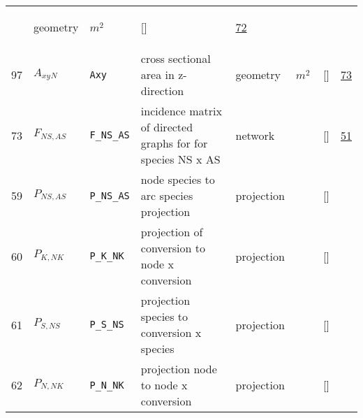 \begin{longtable}{|p{1cm}|p{3cm}|p{3cm}|p{7cm}|p{3.0cm}|p{3cm}|p{2cm}|p{1cm}|}
             & \begin{lay}geometry \end{lay}
             & $ m^{2} \, $
             & []
             & \hyperlink{"e:72"}{ 72 }
                 \\
    97
             & \hypertarget{"v:97"}{ $ {A_{xy}}{_{N}} $}
             & \verb|Axy|
             & cross sectional area in z-direction
             & \begin{lay}geometry \end{lay}
             & $ m^{2} \, $
             & []
             & \hyperlink{"e:73"}{ 73 }
                 \\
    73
             & \hypertarget{"v:73"}{ $ {F}{_{{N S}, {A S}}} $}
             & \verb|F_NS_AS|
             & incidence matrix of directed graphs for for species NS x AS
             & \begin{lay}network \end{lay}
             & $  $
             & []
             & \hyperlink{"e:51"}{ 51 }
                 \\
    59
             & \hypertarget{"v:59"}{ $ {P}{_{{N S}, {A S}}} $}
             & \verb|P_NS_AS|
             & node species to arc species projection
             & \begin{lay}projection \end{lay}
             & $  $
             & []
             & \\
    60
             & \hypertarget{"v:60"}{ $ {P}{_{K, {N K}}} $}
             & \verb|P_K_NK|
             & projection of conversion to node x conversion
             & \begin{lay}projection \end{lay}
             & $  $
             & []
             & \\
    61
             & \hypertarget{"v:61"}{ $ {P}{_{S, {N S}}} $}
             & \verb|P_S_NS|
             & projection species to conversion x species
             & \begin{lay}projection \end{lay}
             & $  $
             & []
             & \\
    62
             & \hypertarget{"v:62"}{ $ {P}{_{N, {N K}}} $}
             & \verb|P_N_NK|
             & projection node to node x conversion
             & \begin{lay}projection \end{lay}
             & $  $
             & []
             & \\

\end{longtable}
